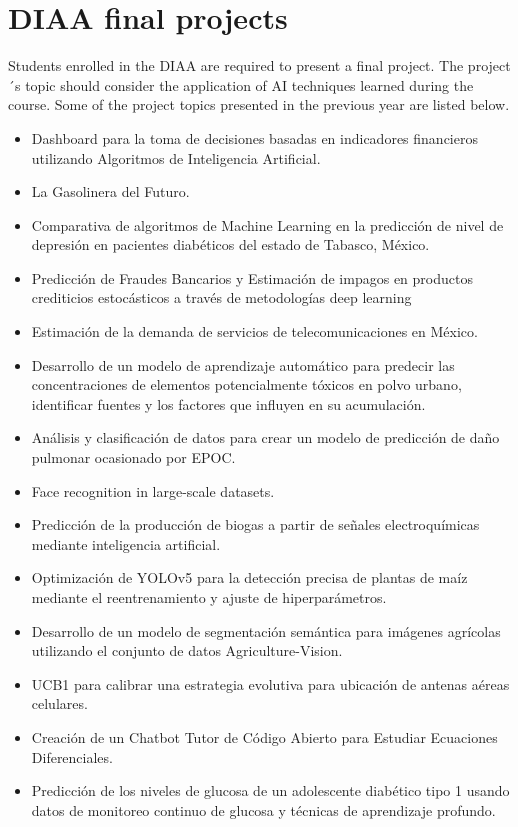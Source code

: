 \documentclass{tufte-handout}
\begin{document}
\section{DIAA final projects}

Students enrolled in the DIAA are required to present a final project. The project´s topic should consider the application of AI techniques learned during the course. Some of the project topics presented in the previous year are listed below.

\begin{itemize}
\item Dashboard para la toma de decisiones basadas en indicadores financieros utilizando Algoritmos de Inteligencia Artificial.
\item La Gasolinera del Futuro.
\item Comparativa de algoritmos de Machine Learning en la predicción de nivel de depresión en pacientes diabéticos del estado de Tabasco, México.
\item Predicción de Fraudes Bancarios y Estimación de impagos en productos crediticios estocásticos a través de metodologías deep learning
\item Estimación de la demanda de servicios de telecomunicaciones en México.
\item Desarrollo de un modelo de aprendizaje automático para predecir las concentraciones de elementos potencialmente tóxicos en polvo urbano, identificar fuentes y los factores que influyen en su acumulación.
\item Análisis y clasificación de datos para crear un modelo de predicción de daño pulmonar ocasionado por EPOC.
\item Face recognition in large-scale datasets.
\item Predicción de la producción de biogas a partir de señales electroquímicas mediante inteligencia artificial.
\item Optimización de YOLOv5 para la detección precisa de plantas de maíz mediante el reentrenamiento y ajuste de hiperparámetros.
\item Desarrollo de un modelo de segmentación semántica para imágenes agrícolas utilizando el conjunto de datos Agriculture-Vision.
\item UCB1 para calibrar una estrategia evolutiva para ubicación de antenas aéreas celulares.
\item Creación de un Chatbot Tutor de Código Abierto para Estudiar Ecuaciones Diferenciales.
\item Predicción de los niveles de glucosa de un adolescente diabético tipo 1 usando datos de monitoreo continuo de glucosa y técnicas de aprendizaje profundo. 

\end{itemize}
\end{document}
